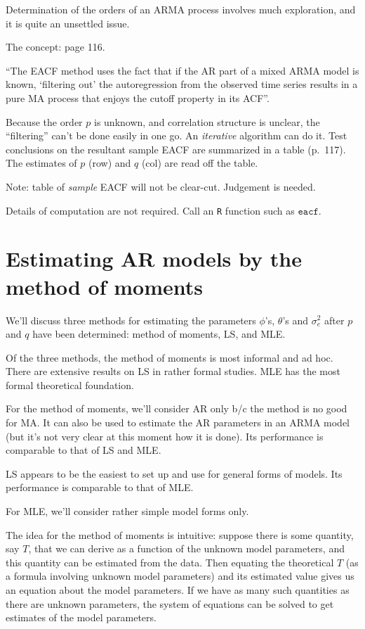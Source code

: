 \documentclass[12pt]{article}
\begin{document}
Determination of the orders of an ARMA process
involves much exploration,
and it is quite an unsettled issue.

The concept: page 116.

``The EACF method uses the fact that if the AR part of a mixed
ARMA model is known,
`filtering out' the autoregression from the observed time series results
in a pure MA process that enjoys the cutoff property in its ACF''.

Because the order $p$ is unknown, and correlation structure is unclear,
the ``filtering'' can't be done easily in one go.
An \emph{iterative} algorithm can do it.
Test conclusions on the resultant sample EACF
are summarized in a table (p.~117).
The estimates of $p$ (row) and $q$ (col) are read off the table.

Note: table of \emph{sample} EACF will not be clear-cut.
Judgement is needed.

Details of computation are not required.
Call an \texttt{R} function such as
$\texttt{eacf}$.



\section{Estimating AR models by the method of moments}

We'll discuss three methods for estimating the parameters
$\phi$'s, $\theta$'s and $\sigma^2_e$ after
$p$ and $q$ have been determined:
method of moments, LS, and MLE.

Of the three methods, the method of moments is most informal and ad hoc.
There are extensive results on LS in rather formal studies.
MLE has the most formal theoretical foundation.

For the method of moments, we'll consider AR only b/c
the method is no good for MA.
It can also be used to estimate the AR parameters
in an ARMA model (but it's not very clear at this moment how it is done).
Its performance is comparable to that of LS and MLE.

LS appears to be the easiest to set up and use for general forms of
models. Its performance is comparable to that of MLE.

For MLE, we'll consider rather simple model forms only.

\bigskip

The idea for the method of moments is intuitive:
suppose there is some quantity, say $T$, that we can derive
as a function of the unknown model parameters,
and this quantity can be estimated from the data.
Then equating the theoretical $T$
(as a formula involving unknown model parameters)
and its estimated value
gives us an equation about the model parameters.
If we have as many such quantities as there are unknown parameters,
the system of equations can be solved to get estimates of the model
parameters.
\end{document}
